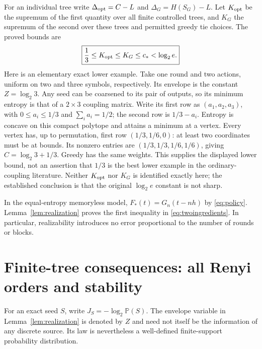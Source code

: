 \documentclass[11pt,a4paper]{article}
\newcommand{\Prob}{\mathbb P}
\begin{document}
For an individual tree write
$\Delta_{\rm opt}=C-L$ and $\Delta_G=H(S_G)-L$.
Let $K_{\rm opt}$ be the supremum of the first quantity over all finite
controlled trees, and $K_G$ the supremum of the second over these trees
and permitted greedy tie choices. The proved bounds are
\[
\boxed{\frac13\le K_{\rm opt}\le K_G\le c_*<\log_2e.}
\]
Here is an elementary exact lower example. Take one round and two actions,
uniform on two and three symbols, respectively. Its envelope is the
constant $Z=\log_2 3$. Any seed can be coarsened to its pair of outputs,
so its minimum entropy is that of a $2\times3$ coupling matrix. Write
its first row as $(a_1,a_2,a_3)$, with $0\le a_i\le1/3$ and
$\sum_i a_i=1/2$; the second row is $1/3-a_i$. Entropy is concave on
this compact polytope and attains a minimum at a vertex. Every vertex
has, up to permutation, first row $(1/3,1/6,0)$: at least two coordinates
must be at bounds. Its nonzero entries are
$(1/3,1/3,1/6,1/6)$, giving
$C=\log_2 3+1/3$. Greedy has the same weights.
This supplies the displayed lower bound, not an assertion that $1/3$
is the best lower example in the ordinary-coupling literature.
Neither $K_{\rm opt}$ nor $K_G$ is identified exactly here; the established
conclusion is that the original $\log_2e$ constant is not sharp.

In the equal-entropy memoryless model, $F_*(t)=G_n(t-nh)$ by
\eqref{eq:policy}. Lemma~\ref{lem:realization} proves the first
inequality in \eqref{eq:twoingredients}. In particular, realizability
introduces no error proportional to the number of rounds or blocks.


\section{Finite-tree consequences: all Renyi orders and stability}
For an exact seed $S$, write $J_S=-\log_2\Prob(S)$. The envelope variable
in Lemma~\ref{lem:realization} is denoted by $Z$ and need not itself be
the information of any discrete source. Its law is nevertheless a
well-defined finite-support probability distribution.
\end{document}
